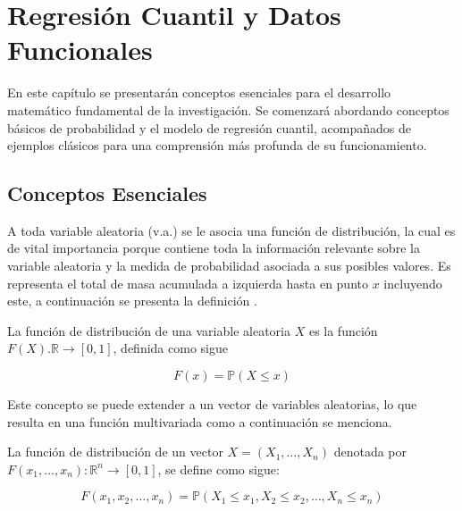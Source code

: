 \chapter{Regresión Cuantil y Datos Funcionales}\label{RegCuanDatosFun}

En este capítulo se presentarán conceptos esenciales para el desarrollo matemático fundamental de la investigación. Se comenzará abordando conceptos básicos de probabilidad y el modelo de regresión cuantil, acompañados de ejemplos clásicos para una comprensión más profunda de su funcionamiento.



\section{Conceptos Esenciales}

A toda variable aleatoria (v.a.) se le asocia una función de distribución, la cual es de vital importancia porque contiene toda la información relevante sobre la variable aleatoria y la medida de probabilidad asociada a sus posibles valores. Es representa el total de masa acumulada a izquierda hasta en punto $x$ incluyendo este, a continuación se presenta la definición \cite{Rincon}.

\begin{defn}
    La función de distribución de una variable aleatoria $X$ es la función $F(X). \mathbb{R} \to [0, 1]$, definida como sigue

    \begin{equation}
        F(x) = \mathbb{P}(X \leq x)
    \end{equation}
\end{defn}


Este concepto se puede extender a un vector de variables aleatorias, lo que resulta en una función multivariada como a continuación se menciona. 

\begin{defn}
    La función de distribución de un vector $X = (X_1, \dots , X_n)$ denotada por $F(x_1, \dots, x_n): \mathbb{R}^{n} \to [0, 1]$, se define como sigue:

    \begin{equation}
        F(x_1, x_2, \dots, x_n) = \mathbb{P}\left ( X_1 \leq x_1, X_2 \leq x_2, \dots, X_n \leq x_n \right )
    \end{equation}
\end{defn}

